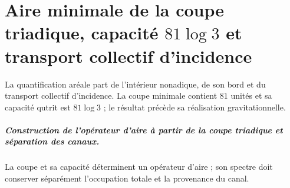 \chapter{Aire minimale de la coupe triadique, capacité \texorpdfstring{\(81\log 3\)}{81 log 3} et transport collectif d’incidence}
\label{chap:parte-iv-58}

La quantification aréale part de l’intérieur nonadique, de son bord et du transport collectif d’incidence. La coupe minimale contient \(81\) unités et sa capacité qutrit est \(81\log 3\) ; le résultat précède sa réalisation gravitationnelle.



\paragraph{Construction de l’opérateur d’aire à partir de la coupe triadique et séparation des canaux.} La coupe et sa capacité déterminent un opérateur d’aire ; son spectre doit conserver séparément l’occupation totale et la provenance du canal.
